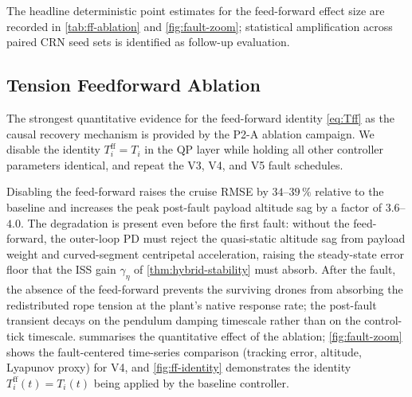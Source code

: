 The headline deterministic point estimates for the feed-forward effect size are recorded in \cref{tab:ff-ablation} and \cref{fig:fault-zoom}; statistical amplification across paired CRN seed sets is identified as follow-up evaluation.

\subsection{Tension Feedforward Ablation}
\label{sec:VI-D}

The strongest quantitative evidence for the feed-forward identity \eqref{eq:Tff} as the causal recovery mechanism is provided by the P2-A ablation campaign. We disable the identity $T_i^{\mathrm{ff}} = T_i$ in the QP layer while holding all other controller parameters identical, and repeat the V3, V4, and V5 fault schedules.

Disabling the feed-forward raises the cruise RMSE by $34$--$39\,\%$ relative to the baseline and increases the peak post-fault payload altitude sag by a factor of $3.6$--$4.0$. The degradation is present even before the first fault: without the feed-forward, the outer-loop PD must reject the quasi-static altitude sag from payload weight and curved-segment centripetal acceleration, raising the steady-state error floor that the ISS gain $\gamma_\eta$ of \cref{thm:hybrid-stability} must absorb. After the fault, the absence of the feed-forward prevents the surviving drones from absorbing the redistributed rope tension at the plant's native response rate; the post-fault transient decays on the pendulum damping timescale rather than on the control-tick timescale.  summarises the quantitative effect of the ablation; \cref{fig:fault-zoom} shows the fault-centered time-series comparison (tracking error, altitude, Lyapunov proxy) for V4, and \cref{fig:ff-identity} demonstrates the identity $T_i^{\mathrm{ff}}(t) = T_i(t)$ being applied by the baseline
controller.

